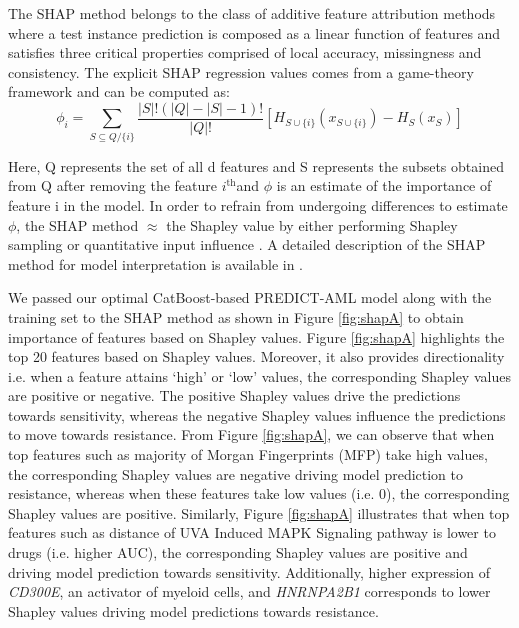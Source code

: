 \documentclass[pdflatex,sn-mathphys-num]{sn-jnl}%
\theoremstyle{thmstyleone}%
\theoremstyle{thmstyletwo}%
\theoremstyle{thmstylethree}%
\begin{document}
The SHAP method belongs to the class of additive feature attribution methods where a test instance prediction is composed as a linear function of features and satisfies three critical properties comprised of local accuracy, missingness and consistency. The explicit SHAP regression values comes from a game-theory framework \cite{lipovetsky2001analysis,shapley1953stochastic} and can be computed as:
\begin{equation}
    \phi_{i} = \sum_{S \subseteq Q/\{i\}}\frac{|S|!(|Q|-|S|-1)!}{|Q|!} [H_{S\cup{\{i\}}}(x_{S \cup \{i\}}) - H_{S}(x_{S})]
\end{equation}

Here, Q represents the set of all d features and S represents the subsets obtained from Q after removing the feature $i^{\text{th}}$and $\phi$ is an estimate of the importance of feature i in the model. 
In order to refrain from undergoing differences to estimate $\phi$, the SHAP method $\approx$ the Shapley value by either performing Shapley sampling \cite{strumbelj2010efficient} or quantitative input influence \cite{datta2016algorithmic}. A detailed description of the SHAP method for model interpretation is available in \cite{lundberg2017unified}.

We passed our optimal CatBoost-based PREDICT-AML model along with the training set to the SHAP method as shown in Figure \ref{fig:shapA} to obtain importance of features based on Shapley values. Figure \ref{fig:shapA} highlights the top 20 features based on Shapley values. Moreover, it also provides directionality i.e. when a feature attains ‘high’ or ‘low’ values, the corresponding Shapley values are positive or negative. The positive Shapley values drive the predictions towards sensitivity, whereas the negative Shapley values influence the predictions to move towards resistance. From Figure \ref{fig:shapA}, we can observe that when top features such as majority of Morgan Fingerprints (MFP) take high values, the corresponding Shapley values are negative driving model prediction to resistance, whereas when these features take low values (i.e. 0), the corresponding Shapley values are positive. Similarly, Figure \ref{fig:shapA} illustrates that when top features such as distance of UVA Induced MAPK Signaling pathway is lower to drugs (i.e. higher AUC), the corresponding Shapley values are positive and driving model prediction towards sensitivity. Additionally, higher expression of \textit{CD300E}, an activator of myeloid cells, and \textit{HNRNPA2B1} corresponds to lower Shapley values driving model predictions towards resistance.
\end{document}
